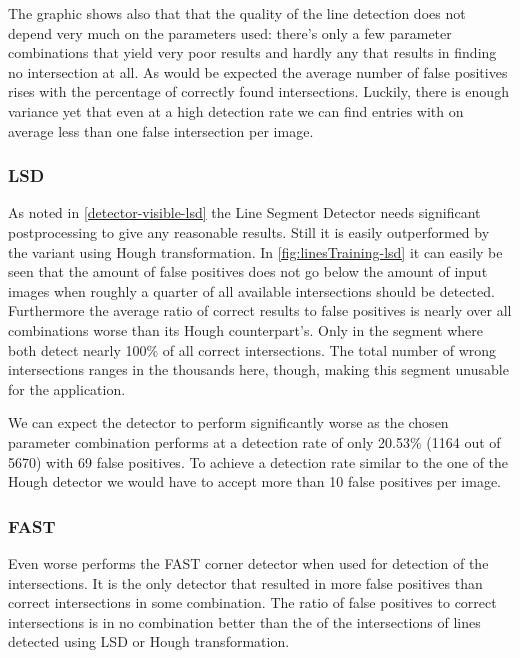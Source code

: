 	The graphic shows also that that the quality of the line detection does not depend very much on the parameters used: there's only a few parameter combinations that yield very poor results and hardly any that results in finding no intersection at all. As would be expected the average number of false positives rises with the percentage of correctly found intersections. Luckily, there is enough variance yet that even at a high detection rate we can find entries with on average less than one false intersection per image.

	\subsubsection{LSD}
	\label{evaluation-visible-optimization-lsd}
	As noted in \autoref{detector-visible-lsd} the Line Segment Detector needs significant postprocessing to give any reasonable results. Still it is easily outperformed by the variant using Hough transformation. In \autoref{fig:linesTraining-lsd} it can easily be seen that the amount of false positives does not go below the amount of input images when roughly a quarter of all available intersections should be detected. Furthermore the average ratio of correct results to false positives is nearly over all combinations worse than its Hough counterpart's. Only in the segment where both detect nearly 100\% of all correct intersections. The total number of wrong intersections ranges in the thousands here, though, making this segment unusable for the application.

	We can expect the detector to perform significantly worse as the chosen parameter combination performs at a detection rate of only 20.53\% (1164 out of 5670) with 69 false positives. To achieve a detection rate similar to the one of the Hough detector we would have to accept more than 10 false positives per image.

	\subsubsection{FAST}
	\label{evaluation-visible-optimization-fast}
	Even worse performs the FAST corner detector when used for detection of the intersections. It is the only detector that resulted in more false positives than correct intersections in some combination. The ratio of false positives to correct intersections is in no combination better than the of the intersections of lines detected using LSD or Hough transformation.

